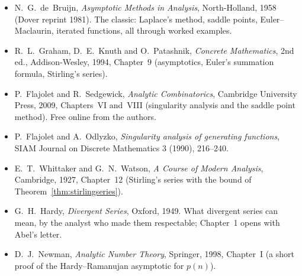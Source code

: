 \begin{itemize}
\item N.~G.~de~Bruijn, \emph{Asymptotic Methods in Analysis}, North-Holland, 1958 (Dover reprint 1981). The classic: Laplace's method, saddle points,
Euler--Maclaurin, iterated functions, all through worked examples.
\item R.~L.~Graham, D.~E.~Knuth and O.~Patashnik, \emph{Concrete Mathematics}, 2nd ed., Addison-Wesley, 1994, Chapter~9 (asymptotics, Euler's
summation formula, Stirling's series).
\item P.~Flajolet and R.~Sedgewick, \emph{Analytic Combinatorics}, Cambridge University Press, 2009, Chapters~VI and~VIII (singularity analysis and the
saddle point method). Free online from the authors.
\item P.~Flajolet and A.~Odlyzko, \emph{Singularity analysis of generating functions}, SIAM Journal on Discrete Mathematics 3 (1990), 216--240.
\item E.~T.~Whittaker and G.~N.~Watson, \emph{A Course of Modern Analysis}, Cambridge, 1927, Chapter~12 (Stirling's series with the bound of
Theorem~\ref{thm:stirlingseries}).
\item G.~H.~Hardy, \emph{Divergent Series}, Oxford, 1949. What divergent series can mean, by the analyst who made them respectable; Chapter~1 opens
with Abel's letter.
\item D.~J.~Newman, \emph{Analytic Number Theory}, Springer, 1998, Chapter~I (a short proof of the Hardy--Ramanujan asymptotic for $p(n)$).
\end{itemize}
